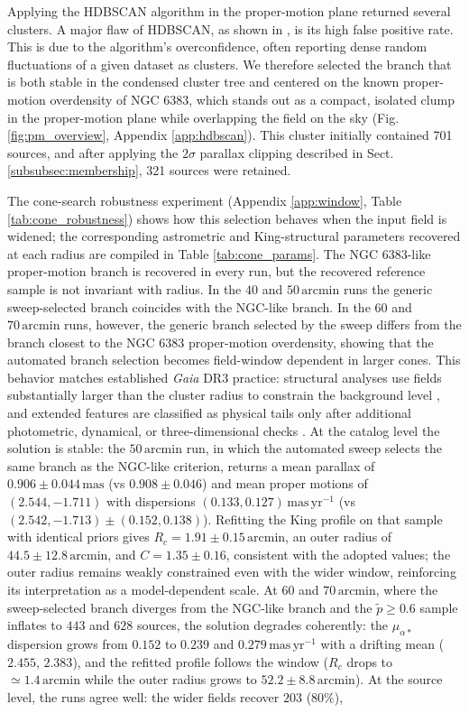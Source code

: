 \documentclass{aa}
\begin{document}
Applying the HDBSCAN algorithm in the proper-motion plane returned several clusters. A major flaw of HDBSCAN, as shown in \citet{2021A&A...646A.104H}, is its high false positive rate. This is due to the algorithm's overconfidence, often reporting dense random fluctuations of a given dataset as clusters. We therefore selected the branch that is both stable in the condensed cluster tree and centered on the known proper-motion overdensity of NGC 6383, which stands out as a compact, isolated clump in the proper-motion plane while overlapping the field on the sky (Fig. \ref{fig:pm_overview}, Appendix \ref{app:hdbscan}). This cluster initially contained 701 sources, and after applying the $2\sigma$ parallax clipping described in Sect. \ref{subsubsec:membership}, 321 sources were retained.

The cone-search robustness experiment (Appendix \ref{app:window}, Table \ref{tab:cone_robustness}) shows how this selection behaves when the input field is widened; the corresponding astrometric and King-structural parameters recovered at each radius are compiled in Table \ref{tab:cone_params}. The NGC 6383-like proper-motion branch is recovered in every run, but the recovered reference sample is not invariant with radius. In the $40$ and $50\,\mathrm{arcmin}$ runs the generic sweep-selected branch coincides with the NGC-like branch. In the $60$ and $70\,\mathrm{arcmin}$ runs, however, the generic branch selected by the sweep differs from the branch closest to the NGC 6383 proper-motion overdensity, showing that the automated branch selection becomes field-window dependent in larger cones. This behavior matches established \textit{Gaia} DR3 practice: structural analyses use fields substantially larger than the cluster radius to constrain the background level \citep{2025MNRAS.539.2513A}, and extended features are classified as physical tails only after additional photometric, dynamical, or three-dimensional checks \citep{2025A&A...694A.258R,2025A&A...698A.156X}. At the catalog level the solution is stable: the $50\,\mathrm{arcmin}$ run, in which the automated sweep selects the same branch as the NGC-like criterion, returns a mean parallax of $0.906\pm0.044\,\mathrm{mas}$ (vs $0.908\pm0.046$) and mean proper motions of $(2.544,-1.711)$ with dispersions $(0.133,0.127)\,\mathrm{mas\,yr^{-1}}$ (vs $(2.542,-1.713)\pm(0.152,0.138)$). Refitting the King profile on that sample with identical priors gives $R_c=1.91\pm0.15\,\mathrm{arcmin}$, an outer radius of $44.5\pm12.8\,\mathrm{arcmin}$, and $C=1.35\pm0.16$, consistent with the adopted values; the outer radius remains weakly constrained even with the wider window, reinforcing its interpretation as a model-dependent scale. At $60$ and $70\,\mathrm{arcmin}$, where the sweep-selected branch diverges from the NGC-like branch and the $\tilde{p}\geq0.6$ sample inflates to $443$ and $628$ sources, the solution degrades coherently: the $\mu_{\alpha*}$ dispersion grows from $0.152$ to $0.239$ and $0.279\,\mathrm{mas\,yr^{-1}}$ with a drifting mean ($2.455$, $2.383$), and the refitted profile follows the window ($R_c$ drops to $\simeq1.4\,\mathrm{arcmin}$ while the outer radius grows to $52.2\pm8.8\,\mathrm{arcmin}$). At the source level, the runs agree well: the wider fields recover $203$ ($80\%$), 
\end{document}
